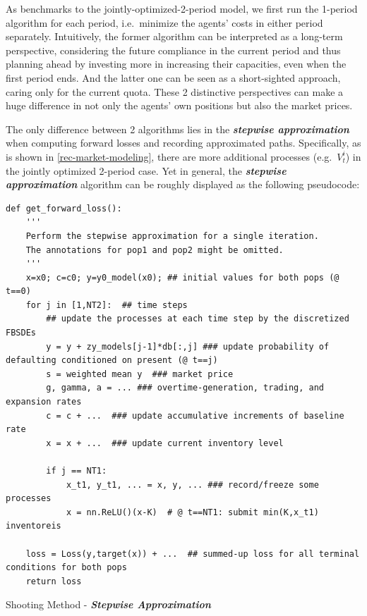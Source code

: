 \documentclass[a4paper,10pt]{article}
\newcommand{\1}{\mathbf{1}}
\begin{document}
As benchmarks to the jointly-optimized-2-period model, we first run the 1-period
algorithm for each period, i.e.~minimize the agents' costs in either
period separately. Intuitively, the former algorithm can be interpreted
as a long-term perspective, considering the future compliance in the
current period and thus planning ahead by investing more in increasing
their capacities, even when the first period ends. And the latter one
can be seen as a short-sighted approach, caring only for the current
quota. These 2 distinctive perspectives can make a huge difference in
not only the agents' own positions but also the market prices.

The only difference between 2 algorithms lies in the \textbf{\textit{stepwise approximation}} when computing forward losses and recording approximated
paths. Specifically, as is shown in \ref{rec-market-modeling}, there are more additional processes (e.g.~\(V_t^i\)) in the jointly optimized 2-period case. Yet in general, the \textbf{\textit{stepwise approximation}} algorithm can be roughly displayed as the following pseudocode:

\begin{algorithm}[h]
\begin{verbatim}
def get_forward_loss():
    '''
    Perform the stepwise approximation for a single iteration. 
    The annotations for pop1 and pop2 might be omitted.
    '''
    x=x0; c=c0; y=y0_model(x0); ## initial values for both pops (@ t==0)
    for j in [1,NT2]:  ## time steps
        ## update the processes at each time step by the discretized FBSDEs
        y = y + zy_models[j-1]*db[:,j] ### update probability of defaulting conditioned on present (@ t==j)
        s = weighted mean y  ### market price
        g, gamma, a = ... ### overtime-generation, trading, and expansion rates 
        c = c + ...  ### update accumulative increments of baseline rate
        x = x + ...  ### update current inventory level

        if j == NT1:
            x_t1, y_t1, ... = x, y, ... ### record/freeze some processes 
            x = nn.ReLU()(x-K)  # @ t==NT1: submit min(K,x_t1) inventoreis

    loss = Loss(y,target(x)) + ...  ## summed-up loss for all terminal conditions for both pops
    return loss 
\end{verbatim}
\caption{Shooting Method - \textbf{\textit{Stepwise Approximation}}} 
\label{alg:stepwise-approx}
\end{algorithm}
\end{document}
